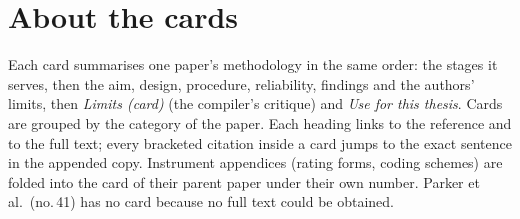 \chapter*{About the cards}
Each card summarises one paper's methodology in the same order: the stages it serves, then the aim, design, procedure, reliability, findings and the authors' limits, then \emph{Limits (card)} (the compiler's critique) and \emph{Use for this thesis}. Cards are grouped by the category of the paper. Each heading links to the reference and to the full text; every bracketed citation inside a card jumps to the exact sentence in the appended copy. Instrument appendices (rating forms, coding schemes) are folded into the card of their parent paper under their own number. Parker et al.\ (no.\,41) has no card because no full text could be obtained.
